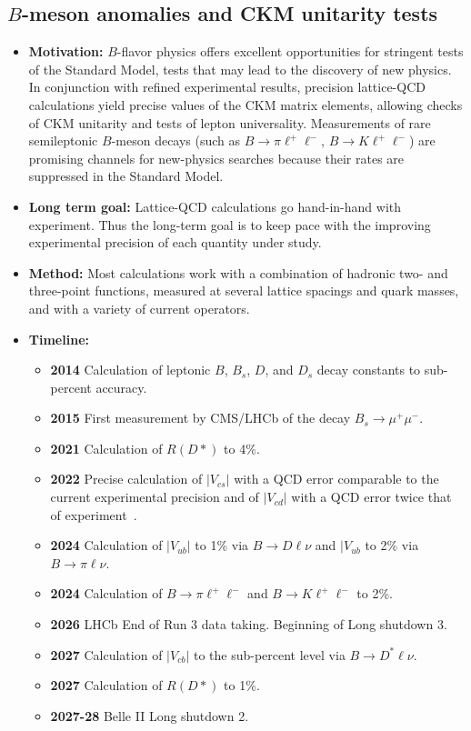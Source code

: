 \documentclass[12pt,hyperpdf]{article}
\begin{document}
\subsection{$B$-meson anomalies and CKM unitarity tests}
\begin{itemize}
    \item{\bf Motivation:} $B$-flavor physics offers excellent opportunities for stringent tests of the Standard Model, tests that may lead to the discovery of new physics. In conjunction with refined experimental results, precision lattice-QCD calculations yield precise values of the CKM matrix elements, allowing checks of CKM unitarity and tests of lepton universality. Measurements of rare semileptonic $B$-meson decays (such as $B\to\pi\ell^+\ell^-$, $B\to K\ell^+\ell^-$) are promising channels for new-physics searches because their rates are suppressed in the Standard Model.
    \item{\bf Long term goal:} Lattice-QCD calculations go hand-in-hand with experiment.  Thus the long-term goal is to keep pace with the improving experimental precision of each quantity under study.
    \item{\bf Method:} Most calculations work with a combination of hadronic two- and three-point functions, measured at several lattice spacings and quark masses, and with a variety of current operators. 
\item{\bf Timeline:}
\begin{itemize}
    \item{\bf 2014} Calculation of leptonic $B$, $B_s$, $D$, and $D_s$ decay constants to sub-percent accuracy.
    \item{\bf 2015} First measurement by CMS/LHCb of the decay $B_s \to \mu^+\mu^-$.
    \item{\bf 2021} Calculation of $R(D*)$ to 4\%.
    \item{\bf 2022} Precise calculation of $|V_{cs}|$ with a QCD error comparable to the current experimental precision and of $|V_{cd}|$ with a QCD error twice that of experiment~\cite{FermilabLattice:2022gku}.
    \item{\bf 2024} Calculation of $|V_{ub}|$ to 1\% via $B\to D\ell\nu$ and $|V_{ub}$ to 2\% via $B\to \pi\ell\nu$.
    \item{\bf 2024} Calculation of $B\to\pi \ell^+\ell^-$ and $B\to K \ell^+\ell^-$ to 2\%.
    \item{\bf 2026} LHCb End of Run 3 data taking. Beginning of Long shutdown 3.
    \item{\bf 2027} Calculation of $|V_{cb}|$ to the sub-percent level via $B\to D^*\ell\nu$.
    \item{\bf 2027} Calculation of $R(D*)$ to 1\%.
    \item{\bf 2027-28} Belle II Long shutdown 2.
\end{itemize}
\end{itemize}
\end{document}
